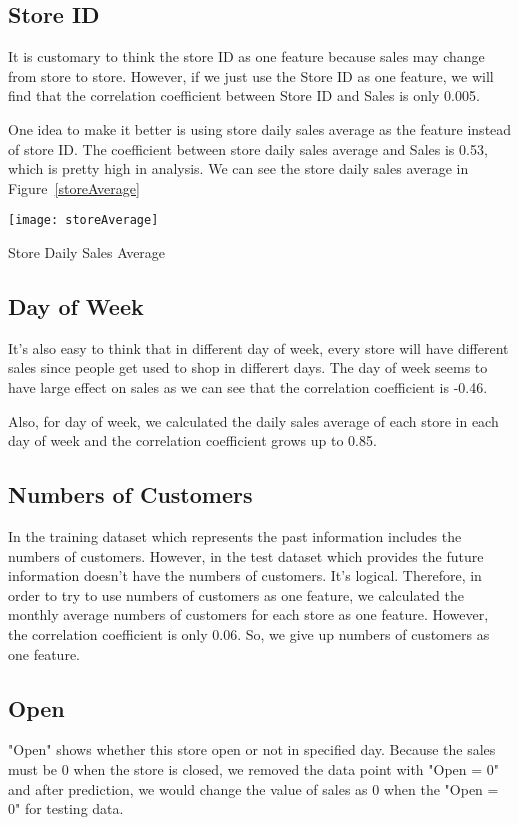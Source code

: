 \documentclass[jou,apacite]{apa6}
\begin{document}
\subsection{Store ID}
It is customary to think the store ID as one feature because sales may change from store to store. However, if we just use the Store ID as one feature, we will find that the correlation coefficient between Store ID and Sales is only 0.005. 

One idea to make it better is using store daily sales average as the feature instead of store ID. The coefficient between store daily sales average and Sales is 0.53, which is pretty high in analysis. We can see the store daily sales average in Figure~\ref{storeAverage}

    \begin{center}
    \texttt{[image: storeAverage]}
    \makeatletter\def\@captype{figure}\makeatother
    \caption{\centering Store Daily Sales Average}
    \label{storeAverage}
    \end{center}  

\subsection{Day of Week}
It's also easy to think that in different day of week, every store will have different sales since people get used to shop in differert days. The day of week seems to have large effect on sales as we can see that the correlation coefficient is -0.46. 

Also, for day of week, we calculated the daily sales average of each store in each day of week and the correlation coefficient grows up to 0.85. 

\subsection{Numbers of Customers}
In the training dataset which represents the past information includes the numbers of customers. However, in the test dataset which provides the future information doesn't have the numbers of customers. It's logical. Therefore, in order to try to use numbers of customers as one feature, we calculated the monthly average numbers of customers for each store as one feature. However, the correlation coefficient is only 0.06. So, we give up numbers of customers as one feature.

\subsection{Open}
"Open" shows whether this store open or not in specified day. Because the sales must be 0 when the store is closed, we removed the data point with "Open = 0" and after prediction, we would change the value of sales as 0 when the "Open = 0" for testing data. 
\end{document}
